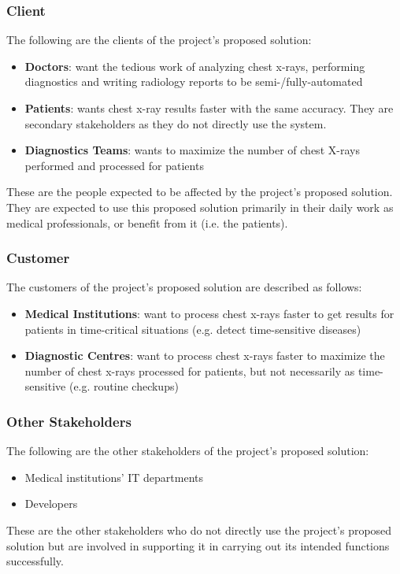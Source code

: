 \documentclass[12pt]{article}
\begin{document}
\subsubsection{Client}
The following are the clients of the project's proposed solution:
\begin{itemize}
    \item \textbf{Doctors}: want the tedious work of analyzing chest x-rays, performing diagnostics and writing radiology reports to be semi-/fully-automated
    \item \textbf{Patients}: wants chest x-ray results faster with the same accuracy. They are secondary stakeholders as they do not directly use the system.
    \item \textbf{Diagnostics Teams}: wants to maximize the number of chest X-rays performed and processed for patients
\end{itemize}
These are the people expected to be affected by the project's proposed solution. They are expected to use this proposed solution primarily in their daily work as medical professionals, or benefit from it (i.e. the patients).

\subsubsection{Customer}
The customers of the project's proposed solution are described as follows:
\begin{itemize}
    \item \textbf{Medical Institutions}: want to process chest x-rays faster to get results for patients in time-critical situations (e.g. detect time-sensitive diseases)
    \item \textbf{Diagnostic Centres}: want to process chest x-rays faster to maximize the number of chest x-rays processed for patients, but not necessarily as time-sensitive (e.g. routine checkups)
\end{itemize}

\subsubsection{Other Stakeholders}
The following are the other stakeholders of the project’s proposed solution: 
\begin{itemize}
    \item Medical institutions’ IT departments 
    \item Developers 
\end{itemize}
These are the other stakeholders who do not directly use the project's proposed solution but are involved in supporting it in carrying out its intended functions successfully.
\end{document}
